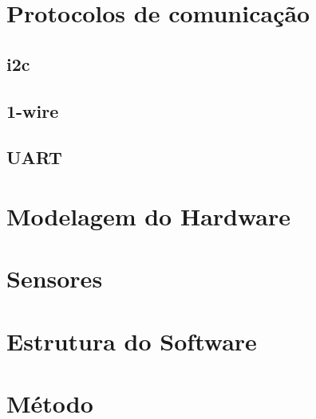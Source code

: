 \documentclass[../../layout.tex]{subfiles}
\begin{document}
\section{Protocolos de comunicação} 
\hspace*{3em}\blindtext[1]
\subsection{i2c}
\hspace*{3em}\blindtext[1]
\subsection{1-wire}
\hspace*{3em}\blindtext[1]
\subsection{UART}
\hspace*{3em}\blindtext[1]

\section{Modelagem do Hardware}
\hspace*{3em}\blindtext[1]

\section{Sensores}
\hspace*{3em}\blindtext[1]

\section{Estrutura do Software}
\hspace*{3em}\blindtext[1]

\section{Método}
\hspace*{3em}\blindtext[1]
\end{document}
